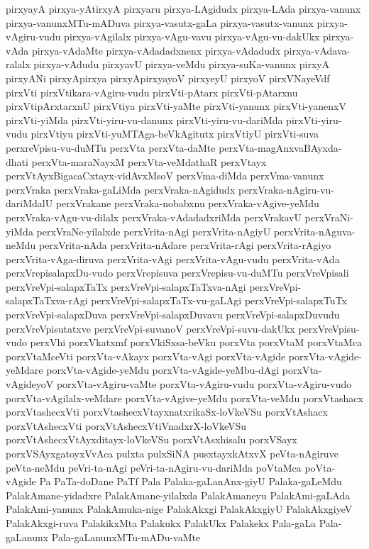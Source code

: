 {pirxyayA
pirxya-yAtirxyA
pirxyaru
pirxya-LAgidudx
pirxya-LAda
pirxya-vanunx
pirxya-vanunxMTu-mADuva
pirxya-vasutx-gaLa
pirxya-vasutx-vanunx
pirxya-vAgiru-vudu
pirxya-vAgilalx
pirxya-vAgu-vavu
pirxya-vAgu-vu-dakUkx
pirxya-vAda
pirxya-vAdaMte
pirxya-vAdadadxnenx
pirxya-vAdadudx
pirxya-vAdava-ralalx
pirxya-vAdudu
pirxyavU
pirxya-veMdu
pirxya-suKa-vanunx
pirxyA
pirxyANi
pirxyApirxya
pirxyApirxyayoV
pirxyeyU
pirxyoV
pirxVNayeVdf
pirxVti
pirxVtikara-vAgiru-vudu
pirxVti-pAtarx
pirxVti-pAtarxnu
pirxVtipArxtarxnU
pirxVtiya
pirxVti-yaMte
pirxVti-yanunx
pirxVti-yanenxV
pirxVti-yiMda
pirxVti-yiru-vu-danunx
pirxVti-yiru-vu-dariMda
pirxVti-yiru-vudu
pirxVtiyu
pirxVti-yuMTAga-beVkAgitutx
pirxVtiyU
pirxVti-suva
perxreVpisu-vu-duMTu
perxVta
perxVta-daMte
perxVta-magAnxvaBAyxda-dhati
perxVta-maraNayxM
perxVta-veMdathaR
perxVtayx
perxVtAyxBigacaCxtayx-vidAvxMsoV
perxVma-diMda
perxVma-vanunx
perxVraka
perxVraka-gaLiMda
perxVraka-nAgidudx
perxVraka-nAgiru-vu-dariMdalU
perxVrakane
perxVraka-nobabxnu
perxVraka-vAgive-yeMdu
perxVraka-vAgu-vu-dilalx
perxVraka-vAdadadxriMda
perxVrakavU
perxVraNi-yiMda
perxVraNe-yilalxde
perxVrita-nAgi
perxVrita-nAgiyU
perxVrita-nAguva-neMdu
perxVrita-nAda
perxVrita-nAdare
perxVrita-rAgi
perxVrita-rAgiyo
perxVrita-vAga-diruva
perxVrita-vAgi
perxVrita-vAgu-vudu
perxVrita-vAda
perxVrepisalapxDu-vudo
perxVrepisuva
perxVrepisu-vu-duMTu
perxVreVpisali
perxVreVpi-salapxTaTx
perxVreVpi-salapxTaTxva-nAgi
perxVreVpi-salapxTaTxva-rAgi
perxVreVpi-salapxTaTx-vu-gaLAgi
perxVreVpi-salapxTuTx
perxVreVpi-salapxDuva
perxVreVpi-salapxDuvavu
perxVreVpi-salapxDuvudu
perxVreVpisutatxve
perxVreVpi-suvanoV
perxVreVpi-suvu-dakUkx
perxVreVpisu-vudo
perxVhi
porxVkatxmf
porxVkiSxsa-beVku
porxVta
porxVtaM
porxVtaMca
porxVtaMceVti
porxVta-vAkayx
porxVta-vAgi
porxVta-vAgide
porxVta-vAgide-yeMdare
porxVta-vAgide-yeMdu
porxVta-vAgide-yeMbu-dAgi
porxVta-vAgideyoV
porxVta-vAgiru-vaMte
porxVta-vAgiru-vudu
porxVta-vAgiru-vudo
porxVta-vAgilalx-veMdare
porxVta-vAgive-yeMdu
porxVta-veMdu
porxVtashacx
porxVtashecxVti
porxVtashecxVtayxnatxrikaSx-loVkeVSu
porxVtAshacx
porxVtAshecxVti
porxVtAshecxVtiVnadxrX-loVkeVSu
porxVtAshecxVtAyxditayx-loVkeVSu
porxVtAsxhisalu
porxVSayx
porxVSAyxgatoyxVvAca
pulxta
pulxSiNA
pusxtayxkAtxvX
peVta-nAgiruve
peVta-neMdu
peVri-ta-nAgi
peVri-ta-nAgiru-vu-dariMda
poVtaMca
poVta-vAgide
Pa
PaTa-doDane
PaTf
Pala
Palaka-gaLanAnx-giyU
Palaka-gaLeMdu
PalakAmane-yidadxre
PalakAmane-yilalxda
PalakAmaneyu
PalakAmi-gaLAda
PalakAmi-yanunx
PalakAmuka-nige
PalakAkxgi
PalakAkxgiyU
PalakAkxgiyeV
PalakAkxgi-ruva
PalakikxMta
Palakukx
PalakUkx
Palakekx
Pala-gaLa
Pala-gaLanunx
Pala-gaLanunxMTu-mADu-vaMte
}
